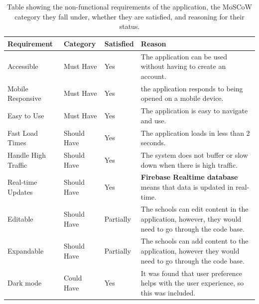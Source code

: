 \documentclass{l4proj}
\begin{document}
\begin{table}[ht]
    \caption{Table showing the non-functional requirements of the application,  the MoSCoW category they fall under,  whether they are satisfied,  and reasoning for their status. }\label{tab:non-functional}
    \begin{tabular}{ m{3cm}  m{2cm}  m{1.5cm}  m{17em} }
    \hline
    \textbf{Requirement}    & \textbf{Category}                & \textbf{Satisfied}      & \textbf{Reason}                      \\ %
    \hline
    
    Accessible & Must Have & Yes & The application can be used without having to create an account. \\

    Mobile Responsive & Must Have & Yes & the application responds to being opened on a mobile device. \\

    Easy to Use& Must Have & Yes & The application is easy to navigate and use. \\

    Fast Load Times & Should Have & Yes & The application loads in less than 2 seconds. \\
    
    Handle High Traffic & Should Have & Yes & The system does not buffer or slow down when there is high traffic. \\
    
    Real-time Updates & Should Have & Yes & \textbf{Firebase Realtime database} means that data is updated in real-time. \\

    Editable & Should Have & Partially & The schools can edit content in the application,  however,  they would need to go through the code base.\\

    Expandable & Should Have & Partially & The schools can add content to the application,  however they would need to go through the code base. \\
    
    Dark mode & Could Have & Yes & It was found that user preference helps with the user experience,  so this was included.

    \end{tabular}
\end{table}
\end{document}
